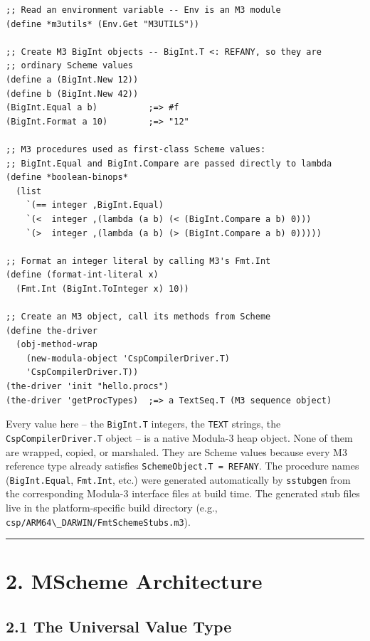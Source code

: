 \documentclass[
  12pt,
]{report}
\newcommand{\passthrough}[1]{#1}
\begin{document}
\begin{lstlisting}
;; Read an environment variable -- Env is an M3 module
(define *m3utils* (Env.Get "M3UTILS"))

;; Create M3 BigInt objects -- BigInt.T <: REFANY, so they are
;; ordinary Scheme values
(define a (BigInt.New 12))
(define b (BigInt.New 42))
(BigInt.Equal a b)          ;=> #f
(BigInt.Format a 10)        ;=> "12"

;; M3 procedures used as first-class Scheme values:
;; BigInt.Equal and BigInt.Compare are passed directly to lambda
(define *boolean-binops*
  (list
    `(== integer ,BigInt.Equal)
    `(<  integer ,(lambda (a b) (< (BigInt.Compare a b) 0)))
    `(>  integer ,(lambda (a b) (> (BigInt.Compare a b) 0)))))

;; Format an integer literal by calling M3's Fmt.Int
(define (format-int-literal x)
  (Fmt.Int (BigInt.ToInteger x) 10))

;; Create an M3 object, call its methods from Scheme
(define the-driver
  (obj-method-wrap
    (new-modula-object 'CspCompilerDriver.T)
    'CspCompilerDriver.T))
(the-driver 'init "hello.procs")
(the-driver 'getProcTypes)  ;=> a TextSeq.T (M3 sequence object)
\end{lstlisting}

Every value here -- the \passthrough{\lstinline!BigInt.T!} integers, the
\passthrough{\lstinline!TEXT!} strings, the
\passthrough{\lstinline!CspCompilerDriver.T!} object -- is a native
Modula-3 heap object. None of them are wrapped, copied, or marshaled.
They are Scheme values because every M3 reference type already satisfies
\passthrough{\lstinline!SchemeObject.T = REFANY!}. The procedure names
(\passthrough{\lstinline!BigInt.Equal!},
\passthrough{\lstinline!Fmt.Int!}, etc.) were generated automatically by
\passthrough{\lstinline!sstubgen!} from the corresponding Modula-3
interface files at build time. The generated stub files live in the
platform-specific build directory (e.g.,
\passthrough{\lstinline!csp/ARM64\_DARWIN/FmtSchemeStubs.m3!}).

\begin{center}\rule{0.5\linewidth}{0.5pt}\end{center}

\section{2. MScheme Architecture}\label{mscheme-architecture}

\subsection{2.1 The Universal Value
Type}\label{the-universal-value-type}
\end{document}
